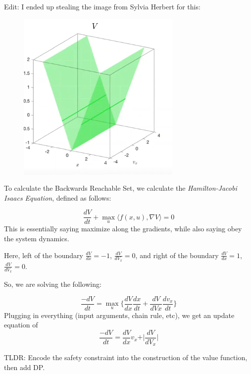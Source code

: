 \documentclass{article}
\begin{document}
Edit: I ended up stealing the image from Sylvia Herbert for this:
\begin{figure}[h!]
    \includegraphics[width = \textwidth]{Screenshot 2024-10-11 125926.png}
\end{figure}


To calculate the Backwards Reachable Set, we calculate the \textit{Hamilton-Jacobi Isaacs Equation}, defined as follows: 

\[ \frac{dV}{dt} + \max_u \langle f(x,u), \nabla V \rangle = 0 \]
This is essentially saying maximize along the gradients, while also saying obey the system dynamics. 

Here, left of the boundary $\frac{dV}{dx} = -1$, $\frac{dV}{dV_x} = 0$, and right of the boundary $\frac{dV}{dx} = 1$, $\frac{dV}{dV_x} = 0$.

So, we are solving the following:

\[\frac{-dV}{dt} = \max_u \{\frac{dV}{dx}\frac{dx}{dt} + \frac{dV}{dVx}\frac{dv_x}{dt}\} \]
Plugging in everything (input arguments, chain rule, etc), we get an update equation of 
\[\frac{-dV}{dt} = \frac{dV}{dx}v_x + \vert \frac{dV}{dV_x} \vert \]

TLDR: Encode the safety constraint into the construction of the value function, then add DP. 
\end{document}
